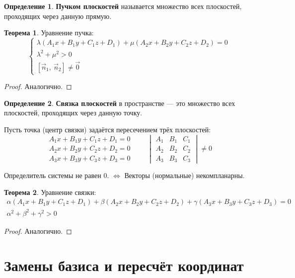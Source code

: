 \documentclass{article}
\theoremstyle{definition}
\newtheorem{definition}{Определение}
\newtheorem{theorem}{Теорема}[section]
\begin{document}
\begin{definition}
\textbf{Пучком плоскостей} называется множество всех плоскостей, проходящих через данную прямую.
\end{definition}

\begin{theorem}
Уравнение пучка:
$$\begin{cases}
\lambda\left(A_1x + B_1y + C_1z + D_1\right) + \mu\left(A_2x + B_2y + C_2z + D_2\right) = 0\\
\lambda^2 + \mu^2 > 0 \\
[\vec n_1,\ \vec n_2] \neq \vec 0
\end{cases}$$
\begin{proof}
Аналогично.
\end{proof}
\end{theorem}

\begin{definition}
\textbf{Связка плоскостей } в пространстве --- это множество всех плоскостей, проходящих через данную точку.
\end{definition}

Пусть точка (центр связки) задаётся пересечением трёх плоскостей:
$$\begin{matrix}
A_1x + B_1y + C_1z + D_1 = 0\\
A_2x + B_2y + C_2z + D_2 = 0\\
A_3x + B_3y + C_3z + D_3 = 0
\end{matrix}\qquad
\begin{vmatrix}
A_1 & B_1 & C_1 \\
A_2 & B_2 & C_2 \\
A_3 & B_3 & C_3
\end{vmatrix} \neq 0$$

Определитель системы не равен 0. $\Longleftrightarrow$ Векторы (нормальные) некомпланарны.

\begin{theorem}
Уравнение связки:
$$\begin{matrix}
\alpha\left(A_1x + B_1y + C_1z + D_1\right) + \beta\left(A_2x + B_2y + C_2z + D_2\right) + \gamma\left(A_3x + B_3y + C_3z + D_3\right) = 0\\
\alpha^2 + \beta^2 + \gamma^2 > 0
\end{matrix}$$
\begin{proof}
Аналогично.
\end{proof}
\end{theorem}

\section{Замены базиса и пересчёт координат}
\end{document}
